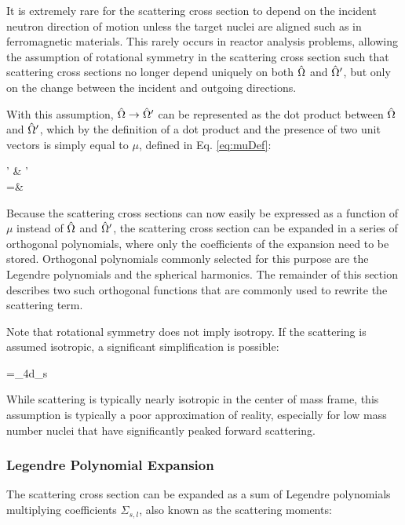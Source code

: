 It is extremely rare for the scattering cross section to depend on the incident neutron direction of motion unless the target nuclei are aligned such as in ferromagnetic materials. This rarely occurs in reactor analysis problems, allowing the assumption of rotational symmetry in the scattering cross section such that scattering cross sections no longer depend uniquely on both \(\hat{\Omega}\) and \(\hat{\Omega}'\), but only on the change between the incident and outgoing directions. 

With this assumption, \(\hat{\Omega}\rightarrow\hat{\Omega}'\) can be represented as the dot product between \(\hat{\Omega}\) and \(\hat{\Omega}'\), which by the definition of a dot product and the presence of two unit vectors is simply equal to \(\mu\), defined in Eq. \eqref{eq:muDef}:

\beqa
\label{eq:OmegaDotOmega}
\hO  \cdot\hO  ' \equiv& \left\Vert\hO\right\Vert \left\Vert\hO  '\right\Vert \cos{(\theta)} \\
=&\ \mu
\eeqa

Because the scattering cross sections can now easily be expressed as a function of \(\mu\) instead of \(\hat{\Omega}\) and \(\hat{\Omega}'\), the scattering cross section can be expanded in a series of orthogonal polynomials, where only the coefficients of the expansion need to be stored. Orthogonal polynomials commonly selected for this purpose are the Legendre polynomials and the spherical harmonics. The remainder of this section describes two such orthogonal functions that are commonly used to rewrite the scattering term. 

Note that rotational symmetry does not imply isotropy. If the scattering is assumed isotropic, a significant simplification is possible:

\beq
{}=\int_{4\pi}d\hO\Sigma_s\seatout
\eeq

While scattering is typically nearly isotropic in the center of mass frame, this assumption is typically a poor approximation of reality, especially for low mass number nuclei that have significantly peaked forward scattering.

\subsubsection{Legendre Polynomial Expansion}
\label{sec:LegendrePolynomialExpansion}

The scattering cross section can be expanded as a sum of Legendre polynomials multiplying coefficients \(\Sigma_{s,l}\), also known as the scattering moments:

